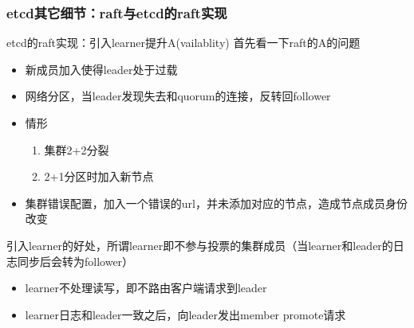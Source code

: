 \documentclass{beamer}
\begin{document}
\begin{frame}
    \frametitle{etcd其它细节：raft与etcd的raft实现}
    \begin{block}{etcd的raft实现：引入learner提升A(vailablity)}
    首先看一下raft的A的问题
    \begin{itemize}
        \item 新成员加入使得leader处于过载
        \item 网络分区，当leader发现失去和quorum的连接，反转回follower
        \item 情形
            \begin{enumerate}
                \item 集群2+2分裂
                \item 2+1分区时加入新节点
            \end{enumerate}
        \item 集群错误配置，加入一个错误的url，并未添加对应的节点，造成节点成员身份改变
    \end{itemize}
    引入learner的好处，所谓learner即不参与投票的集群成员（当learner和leader的日志同步后会转为follower）
    \begin{itemize}
        \item learner不处理读写，即不路由客户端请求到leader
        \item learner日志和leader一致之后，向leader发出member promote请求
    \end{itemize}
    \end{block}
\end{frame}



%
%



\end{document}
